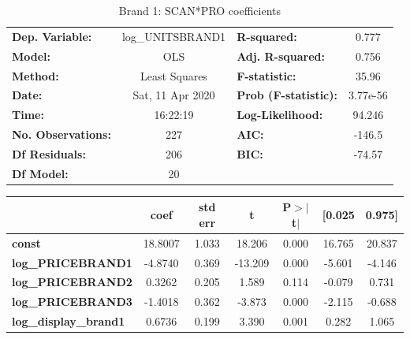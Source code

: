\documentclass[a4paper,11pt]{article}
\begin{document}
\newpage
\begin{center}
\begin{table}
\caption{Brand 1: SCAN*PRO coefficients}\label{tab:brand1}
\begin{tabular}{lclc}

\toprule
\textbf{Dep. Variable:}        & log\_UNITSBRAND1 & \textbf{  R-squared:         } &     0.777   \\
\textbf{Model:}                &       OLS        & \textbf{  Adj. R-squared:    } &     0.756   \\
\textbf{Method:}               &  Least Squares   & \textbf{  F-statistic:       } &     35.96   \\
\textbf{Date:}                 & Sat, 11 Apr 2020 & \textbf{  Prob (F-statistic):} &  3.77e-56   \\
\textbf{Time:}                 &     16:22:19     & \textbf{  Log-Likelihood:    } &    94.246   \\
\textbf{No. Observations:}     &         227      & \textbf{  AIC:               } &    -146.5   \\
\textbf{Df Residuals:}         &         206      & \textbf{  BIC:               } &    -74.57   \\
\textbf{Df Model:}             &          20      & \textbf{                     } &             \\
\bottomrule
\end{tabular}
\end{table}
\begin{tabular}{lcccccc}
                               & \textbf{coef} & \textbf{std err} & \textbf{t} & \textbf{P$> |$t$|$} & \textbf{[0.025} & \textbf{0.975]}  \\
\midrule
\textbf{const}                 &      18.8007  &        1.033     &    18.206  &         0.000        &       16.765    &       20.837     \\
\textbf{log\_PRICEBRAND1}      &      -4.8740  &        0.369     &   -13.209  &         0.000        &       -5.601    &       -4.146     \\
\textbf{log\_PRICEBRAND2}      &       0.3262  &        0.205     &     1.589  &         0.114        &       -0.079    &        0.731     \\
\textbf{log\_PRICEBRAND3}      &      -1.4018  &        0.362     &    -3.873  &         0.000        &       -2.115    &       -0.688     \\
\textbf{log\_display\_brand1}  &       0.6736  &        0.199     &     3.390  &         0.001        &        0.282    &        1.065     \\

\end{tabular}
\end{center}
\end{document}
